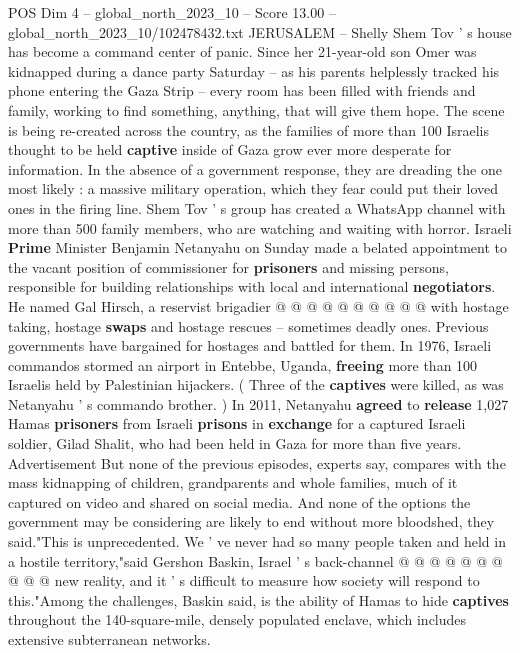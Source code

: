 \begin{textsample}{POS Dim 4 – global\_north\_2023\_10 – Score 13.00 – global\_north\_2023\_10/102478432.txt}  \label{ex:f4_pos_442}
JERUSALEM -- Shelly Shem Tov ' s house has become a command center of panic.
Since her 21-year-old son Omer was kidnapped during a dance party Saturday -- as his parents helplessly tracked his phone entering the Gaza Strip -- every room has been filled with friends and family, working to find something, anything, that will give them hope.
The scene is being re-created across the country, as the families of more than 100 Israelis thought to be held \textbf{captive} inside of Gaza grow ever more desperate for information.
In the absence of a government response, they are dreading the one most likely : a massive military operation, which they fear could put their loved ones in the firing line.
Shem Tov ' s group has created a WhatsApp channel with more than 500 family members, who are watching and waiting with horror.
Israeli \textbf{Prime} Minister Benjamin Netanyahu on Sunday made a belated appointment to the vacant position of commissioner for \textbf{prisoners} and missing persons, responsible for building relationships with local and international \textbf{negotiators}.
He named Gal Hirsch, a reservist brigadier @ @ @ @ @ @ @ @ @ @ with hostage taking, hostage \textbf{swaps} and hostage rescues -- sometimes deadly ones.
Previous governments have bargained for hostages and battled for them.
In 1976, Israeli commandos stormed an airport in Entebbe, Uganda, \textbf{freeing} more than 100 Israelis held by Palestinian hijackers. ( Three of the \textbf{captives} were killed, as was Netanyahu ' s commando brother. ) In 2011, Netanyahu \textbf{agreed} to \textbf{release} 1,027 Hamas \textbf{prisoners} from Israeli \textbf{prisons} in \textbf{exchange} for a captured Israeli soldier, Gilad Shalit, who had been held in Gaza for more than five years.
Advertisement But none of the previous episodes, experts say, compares with the mass kidnapping of children, grandparents and whole families, much of it captured on video and shared on social media.
And none of the options the government may be considering are likely to end without more bloodshed, they said."This is unprecedented.
We ' ve never had so many people taken and held in a hostile territory,"said Gershon Baskin, Israel ' s back-channel @ @ @ @ @ @ @ @ @ @ new reality, and it ' s difficult to measure how society will respond to this."Among the challenges, Baskin said, is the ability of Hamas to hide \textbf{captives} throughout the 140-square-mile, densely populated enclave, which includes extensive subterranean networks.

\end{textsample}
